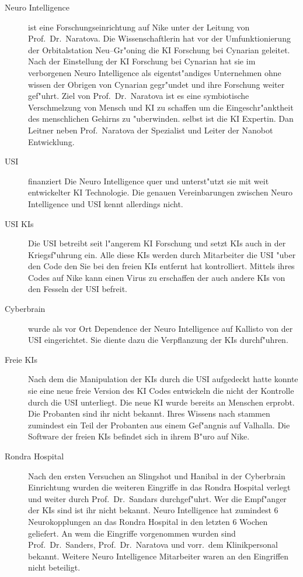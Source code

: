 \begin{description}
	\item[Neuro Intelligence] ist eine Forschungseinrichtung auf Nike unter der Leitung von Prof.~Dr.~Naratova. Die Wissenschaftlerin hat 
		vor der Umfunktionierung der Orbitalstation Neu--Gr"oning die KI Forschung bei Cynarian geleitet. Nach der Einstellung der KI Forschung bei Cynarian hat sie im verborgenen Neuro Intelligence als eigentst"andiges Unternehmen ohne wissen der Obrigen von Cynarian gegr"undet und ihre Forschung weiter gef"uhrt. Ziel von Prof.~Dr.~Naratova ist es eine symbiotische Verschmelzung von Mensch und KI zu schaffen um die Eingeschr"anktheit des menschlichen Gehirns zu "uberwinden. \ml{} selbst ist die KI Expertin. Dan Leitner neben Prof.~Naratova der Spezialist und Leiter der Nanobot Entwicklung.
	\item[USI] finanziert Die Neuro Intelligence quer und unterst"utzt sie mit weit entwickelter KI Technologie. Die genauen Vereinbarungen 
		zwischen Neuro Intelligence und USI kennt \ml{} allerdings nicht.
		\item[USI KIs] Die USI betreibt seit l"angerem KI Forschung und setzt KIs auch in der Kriegsf"uhrung ein. Alle diese KIs werden 
		durch Mitarbeiter die USI "uber den Code den Sie bei den freien KIs entfernt hat kontrolliert. Mittels ihres Codes auf Nike kann \ml{} einen Virus zu erschaffen der auch andere KIs von den Fesseln der USI befreit.		
	\item[Cyberbrain] wurde als vor Ort Dependence der Neuro Intelligence auf Kallisto von der USI eingerichtet. Sie diente dazu die		
		Verpflanzung der KIs durchf"uhren.
	\item[Freie KIs] Nach dem \ml{} die Manipulation der KIs durch die USI aufgedeckt hatte konnte sie eine neue freie Version des KI Codes
		entwickeln die nicht der Kontrolle durch die USI unterliegt. Die neue KI wurde bereits an Menschen erprobt. Die Probanten sind ihr nicht bekannt. Ihres Wissens nach stammen zumindest ein Teil der Probanten aus einem Gef"angnis auf Valhalla. Die Software der freien KIs befindet sich in ihrem B"uro auf Nike.
	\item[Rondra Hospital] Nach den ersten Versuchen an Slingshot und Hanibal in der Cyberbrain Einrichtung wurden die weiteren Eingriffe 	
		in das Rondra Hospital verlegt und weiter durch Prof.~Dr.~Sandars durchgef"uhrt. Wer die Empf"anger der KIs sind ist ihr nicht bekannt. Neuro Intelligence hat zumindest 6 Neurokopplungen an das Rondra Hospital in den letzten 6 Wochen geliefert. An wem die Eingriffe vorgenommen wurden sind Prof.~Dr.~Sanders, Prof.~Dr.~Naratova und vorr.~dem Klinikpersonal bekannt. Weitere Neuro Intelligence Mitarbeiter waren an den Eingriffen nicht beteiligt.
\end{description}

